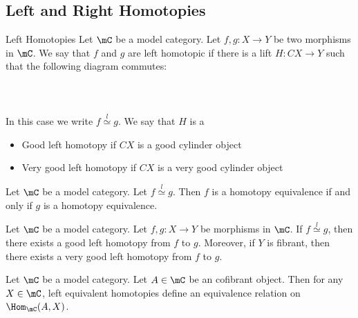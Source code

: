 \documentclass[a4paper]{article}
\begin{document}
\subsection{Left and Right Homotopies}
\begin{defn}{Left Homotopies}{} Let $\mC$ be a model category. Let $f,g:X\to Y$ be two morphisms in $\mC$. We say that $f$ and $g$ are left homotopic if there is a lift $H:CX\to Y$ such that the following diagram commutes: \\~\\
\\~\\
In this case we write $f\overset{l}{\simeq}g$. We say that $H$ is a 
\begin{itemize}
\item Good left homotopy if $CX$ is a good cylinder object
\item Very good left homotopy if $CX$ is a very good cylinder object
\end{itemize}
\end{defn}

\begin{lmm}{}{} Let $\mC$ be a model category. Let $f\overset{l}{\simeq}g$. Then $f$ is a homotopy equivalence if and only if $g$ is a homotopy equivalence. 
\end{lmm}

\begin{prp}{}{} Let $\mC$ be a model category. Let $f,g:X\to Y$ be morphisms in $\mC$. If $f\overset{l}{\simeq}g$, then there exists a good left homotopy from $f$ to $g$. Moreover, if $Y$ is fibrant, then there exists a very good left homotopy from $f$ to $g$. 
\end{prp}

\begin{prp}{}{} Let $\mC$ be a model category. Let $A\in\mC$ be an cofibrant object. Then for any $X\in\mC$, left equivalent homotopies define an equivalence relation on $\Hom_\mC(A,X)$. 
\end{prp}
\end{document}
